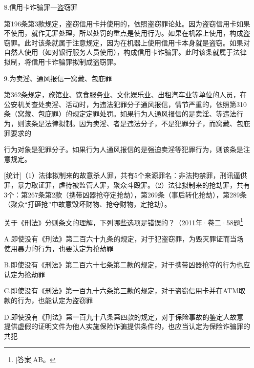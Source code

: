 8.信用卡诈骗罪一盗窃罪

第196条第3款规定，盗窃信用卡并使用的，依照盗窃罪论处。因为盗窃信用卡如果不使用，就作无罪处理，所以处罚的重点是使用行为。如果在机器上使用，构成盗窃罪。此时该条就属于注意规定，因为在机器上使用信用卡本身就是盗窃。如果对自然人使用（如对银行服务人员使用），构成信用卡诈骗罪。此时该条就属于法律拟制，将信用卡诈骗罪拟制成盗窃罪。

9.为卖淫、通风报信一窝藏、包庇罪

第362条规定，旅馆业、饮食服务业、文化娱乐业、出租汽车业等单位的人员，在公安机关查处卖淫、活动时，为违法犯罪分子通风报信，情节严重的，依照第310条（窝藏、包庇罪）的规定定罪处罚。如果行为人通风报信的是卖淫、等违法行为，则该条是法律拟制。因为卖淫、者是违法分子，不是犯罪分子，而窝藏、包庇罪要求的

行为对象是犯罪分子。如果行为人通风报信的是强迫卖淫等犯罪行为，则该条是注意规定。

[统计]（1）法律拟制来的故意杀人罪，共有5个来源罪名：非法拘禁罪，刑讯逼供罪，暴力取证罪，虐待被监管人罪，聚众斗殴罪。（2）法律拟制来的抢劫罪，共有3个：第267条第2款（携带凶器抢夺定抢劫），第269条（事后转化抢劫），第289条（聚众“打砸抢”中故意毁坏财物、抢夺财物，定抢劫）。


关于《刑法》分则条文的理解，下列哪些选项是错误的？（2011年·卷二·58题\footnote{[答案]AB。}

A.即使没有《刑法》第二百六十九条的规定，对于犯盗窃罪，为毁灭罪证而当场使用暴力的行为，也要认定为抢劫罪

B.即使没有《刑法》第二百六十七条第二款的规定，对于携带凶器抢夺的行为也应认定为抢劫罪

C.即使没有《刑法》第一百九十六条第三款的规定，对于盗窃信用卡并在ATM取款的行为，也能认定为盗窃罪

D.即使没有《刑法》第一百九十八条第四款的规定，对于保险事故的鉴定人故意提供虚假的证明文件为他人实施保险诈骗提供条件的，也应当认定为保险诈骗罪的共犯

